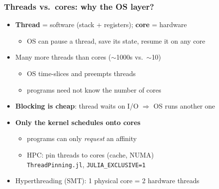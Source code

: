 \documentclass{beamer}
\begin{document}
\begin{frame}[label=backup-threads]
	\frametitle{Threads vs.\ cores: why the OS layer?}
	\begin{itemize}
		\item \textbf{Thread} = software (stack + registers); \textbf{core} = hardware
		      \begin{itemize}
			      \item OS can pause a thread, save its state, resume it on \alert{any} core
		      \end{itemize}
		      \medskip
		\item \alert{Many more threads than cores} (\(\sim\)1000s vs.\ \(\sim\)10)
		      \begin{itemize}
			      \item OS \alert{time-slices} and \alert{preempts} threads
			      \item programs need not know the number of cores
		      \end{itemize}
		      \medskip
		\item \textbf{Blocking is cheap}: thread waits on I/O \(\Rightarrow\) OS runs another one
		      \medskip
		\item \textbf{Only the kernel schedules onto cores}
		      \begin{itemize}
			      \item programs can only \emph{request} an affinity
			      \item HPC: \alert{pin} threads to cores (cache, NUMA)\\
			            \texttt{ThreadPinning.jl}, \texttt{JULIA\_EXCLUSIVE=1}
		      \end{itemize}
		      \medskip
		\item Hyperthreading (SMT): 1 physical core = 2 hardware threads
	\end{itemize}
\end{frame}
\end{document}
